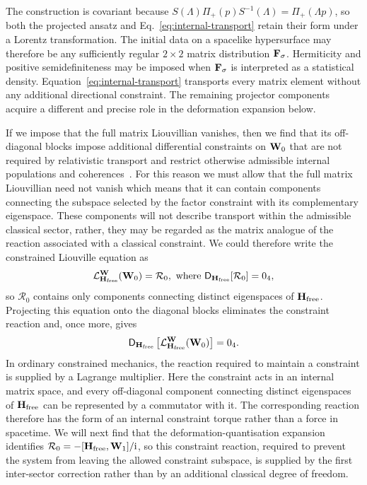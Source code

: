 \documentclass[final,5p,times,twocolumn]{elsarticle}
\begin{document}
The construction is covariant because $S(\Lambda)\Pi_+(p)S^{-1}(\Lambda)=\Pi_+(\Lambda p)$, so both the projected ansatz and Eq.~\eqref{eq:internal-transport} retain their form under a Lorentz transformation. The initial data on a spacelike hypersurface may therefore be any sufficiently regular $2\times2$ matrix distribution $\mathbf{F}_\sigma$. Hermiticity and positive semidefiniteness may be imposed when $\mathbf{F}_\sigma$ is interpreted as a statistical density. Equation~\eqref{eq:internal-transport} transports every matrix element without any additional directional constraint. The remaining projector components acquire a different and precise role in the deformation expansion below.

If we impose that the full matrix Liouvillian vanishes, then we find that its off-diagonal blocks impose additional differential constraints on $\mathbf{W}_0$ that are not required by relativistic transport and restrict otherwise admissible internal populations and coherences~\cite{everitt2026massshellfactorisationspinattempt}.
For this reason we must allow that the full matrix Liouvillian need not vanish which means that it can contain components connecting the subspace selected by the factor constraint with its complementary eigenspace. 
These components will not describe transport within the admissible classical sector, rather, they may be regarded as the matrix analogue of the reaction associated with a classical constraint.
We could therefore write the constrained Liouville equation as
\begin{equation}
    \mathcal{L}^{\mathbf{W}}_{\mathbf{H}_{\mathrm{free}}}(\mathbf{W}_0)
    =\mathcal{R}_0, \text{ where } 
    \mathsf D_{\mathbf{H}_{\mathrm{free}}}[\mathcal{R}_0]=0_4,
\end{equation}
so $\mathcal{R}_0$ contains only components connecting distinct eigenspaces of $\mathbf{H}_{\mathrm{free}}$. 
Projecting this equation onto the diagonal blocks eliminates the constraint reaction and, once more, gives
\begin{equation}
    \mathsf D_{\mathbf{H}_{\mathrm{free}}}
    \left[
   		\mathcal{L}^{\mathbf{W}}_{\mathbf{H}_{\mathrm{free}}}(\mathbf{W}_0)
    \right]=0_4.
\end{equation}
In ordinary constrained mechanics, the reaction required to maintain a constraint is supplied by a Lagrange multiplier. Here the constraint acts in an internal matrix space, and every off-diagonal component connecting distinct eigenspaces of $\mathbf{H}_{\mathrm{free}}$ can be represented by a commutator with it. 
The corresponding reaction therefore has the form of an internal constraint torque rather than a force in spacetime. 
We will next find that the deformation-quantisation expansion identifies $\mathcal{R}_0=-[\mathbf{H}_{\mathrm{free}},\mathbf{W}_1]/\mathrm{i}$, so this constraint reaction, required to prevent the system from leaving the allowed constraint subspace, is supplied by the first inter-sector correction rather than by an additional classical degree of freedom.
\end{document}
